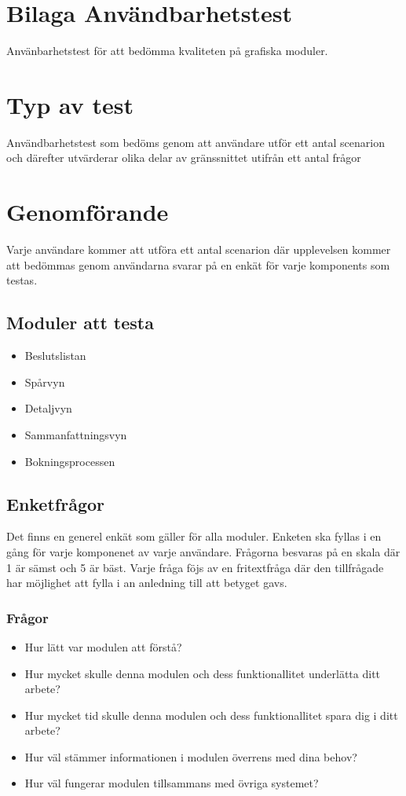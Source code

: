 \section{Bilaga Användbarhetstest}
\label{anvtest}
Använbarhetstest för att bedömma kvaliteten på grafiska moduler.
\section{Typ av test}
Användbarhetstest som bedöms genom att användare utför ett antal scenarion och därefter utvärderar olika delar av gränssnittet utifrån ett antal frågor
\section{Genomförande}
Varje användare kommer att utföra ett antal scenarion där upplevelsen kommer att bedömmas genom användarna svarar på en enkät för varje komponents som testas.
\subsection{Moduler att testa}
\begin{itemize}
	\item Beslutslistan
	\item Spårvyn
	\item Detaljvyn
	\item Sammanfattningsvyn
	\item Bokningsprocessen
\end{itemize}
\subsection{Enketfrågor}
Det finns en generel enkät som gäller för alla moduler. Enketen ska fyllas i en gång för varje komponenet av varje användare.
Frågorna besvaras på en skala där 1 är sämst och 5 är bäst. Varje fråga föjs av en fritextfråga där den tillfrågade har möjlighet att fylla i an anledning till att betyget gavs.

\subsubsection{Frågor}
\begin{itemize}
	\item Hur lätt var modulen att förstå?
	\item Hur mycket skulle denna modulen och dess funktionallitet underlätta ditt arbete?
	\item Hur mycket tid skulle denna modulen och dess funktionallitet spara dig i ditt arbete?	
	\item Hur väl stämmer informationen i modulen överrens med dina behov?
	\item Hur väl fungerar modulen tillsammans med övriga systemet?
\end{itemize}

